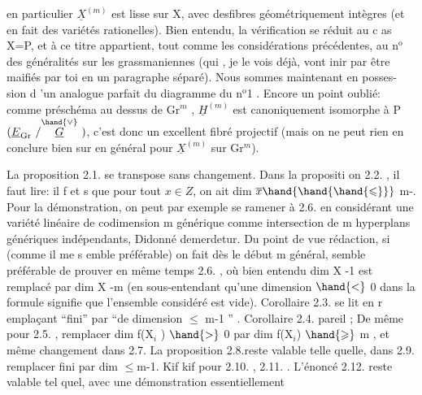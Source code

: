 
en particulier $\underline{X}^{(m)}$ est lisse sur X, avec des\hand{/}fibres géométriquement
intègres (et en fait des variétés rationelles). Bien entendu, la
vérification se réduit au c as X=P, et à ce titre appartient, tout
comme les considérations précédentes, au n$^{\text{o}}$ des généralités sur les
grassmaniennes (qui , je le vois déjà, vont inir par être maifiés
par toi en un paragraphe séparé). Nous sommes maintenant en posses-%
sion d 'un analogue parfait du diagramme du n$^{\text{o}}$1 . Encore un point
oublié: comme préschéma au dessus de Gr$^{m}$ , $\underline{H}^{(m)}$ est canoniquement
isomorphe à P$(\underline{E}_{\mathrm{Gr}}\ /\overset{\hand{\vee}}{\underline{G}}\ )$, c'est donc un excellent fibré projectif
(mais on ne peut rien en conclure bien sur en général pour $\underline{X}^{(m)}$ sur
Gr$^{m}$).

La proposition 2.1. se transpose sans changement. Dans la
propositi on 2.2. , il faut lire: il f et s que pour tout $x \in Z$, on
ait  dim $\overline{x} \hand{\hand{\hand{\leqslant}}}$ m-. Pour la démonstration, on peut par exemple
se ramener à 2.6. en considérant une  variété linéaire de
codimension m générique comme intersection de m hyperplans génériques
indépendants, Didonné demerdetur. Du point de vue rédaction, si
(comme il me s emble préférable) on fait dès le début m général, 
semble préférable de prouver en même temps 2.6. , où bien entendu
dim X -1 est remplacé par dim X -m (en sous-entendant qu'une dimension
$\hand{<}$ 0 dans la formule signifie que l'ensemble considéré est vide).
Corollaire 2.3. se lit en r emplaçant ``fini'' par ``de dimension $\leqslant$ 
m-1 '' . Corollaire 2.4. pareil ; De même pour 2.5. , remplacer
dim f(X$_{i}$ ) $\hand{>}$ 0 par dim f(X$_{i}$) $\hand{\geqslant}$ m , et même changement dans 2.7.
La proposition 2.8.reste valable telle quelle, dans 2.9. remplacer
fini par dim $\leqslant$m-1. Kif kif pour 2.10. , 2.11. . L'énoncé
2.12. reste valable tel quel, avec une démonstration essentiellement

